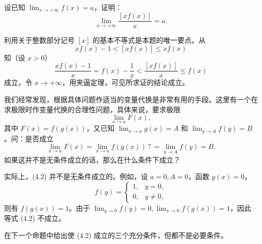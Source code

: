 \begin{xexample}[4.1.5]
设已知 $\lim_{x\to+\infty}f(x)=a$，证明：
\[
  \lim_{x\to+\infty}\frac{[x f(x)]}{x}=a.
\]
\end{xexample}
\begin{xproof}
利用关于整数部分记号 $[x]$ 的基本不等式是本题的唯一要点。从
\[
  x f(x)-1<[x f(x)]\leq x f(x)
\]
知（设 $x>0$）
\[
  \frac{x f(x)-1}{x}=f(x)-\frac1x<\frac{[x f(x)]}{x}\leq f(x)
\]
成立，令 $x\to+\infty$，用夹逼定理，可见所求证的结论成立。
\end{xproof}

我们经常发现，根据具体问题作适当的变量代换是非常有用的手段。这里有一个在求极限时作变量代换的合理性问题，具体来说，要求极限
\[
  \lim_{x\to a}F(x),
\]
其中 $F(x)=f(g(x))$，又已知 $\lim_{x\to a}g(x)=A$ 和 $\lim_{y\to A}f(y)=B$。问：是否成立
\begin{equation}
  \lim_{x\to a}F(x)=\lim_{x\to a}f(g(x))\mathrel{?}=\lim_{y\to A}f(y)=B.
  \tag{4.2}
  \label{eq:4.2}
\end{equation}
如果这并不是无条件成立的话，那么在什么条件下成立？

实际上，(4.2) 并不是无条件成立的。例如，设 $a=0,A=0$，函数 $g(x)=0$，
\[
  f(y)=\begin{cases}
    1,& y=0,\\
    0,& y\ne0,
  \end{cases}
\]
则有 $f(g(x))=1$。由于 $\lim_{y\to0}f(y)=0,\lim_{x\to0}f(g(x))=1$，因此等式 (4.2) 不成立。

在下一个命题中给出使 (4.2) 成立的三个充分条件，但都不是必要条件。

